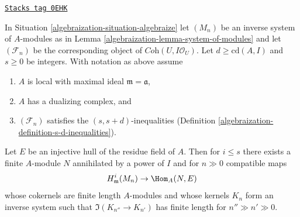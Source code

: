 \begin{lemma}
\label{algebraization-lemma-helper-algebraize}
\href{https://stacks.math.columbia.edu/tag/0EHK}{\texttt{Stacks tag 0EHK}}

In Situation \ref{algebraization-situation-algebraize} let $(M_n)$ be an inverse system of
$A$-modules as in Lemma \ref{algebraization-lemma-system-of-modules} and let
$(\mathcal{F}_n)$ be the corresponding object of
$\textit{Coh}(U, I\mathcal{O}_U)$. Let $d \geq \text{cd}(A, I)$
and $s \geq 0$ be integers.
With notation as above assume
\begin{enumerate}
\item $A$ is local with maximal ideal $\mathfrak m = \mathfrak a$,
\item $A$ has a dualizing complex, and
\item $(\mathcal{F}_n)$ satisfies the $(s, s + d)$-inequalities
(Definition \ref{algebraization-definition-s-d-inequalities}).
\end{enumerate}
Let $E$ be an injective hull of the residue field of $A$. Then for $i \leq s$
there exists a finite $A$-module $N$ annihilated by a power
of $I$ and for $n \gg 0$ compatible maps
$$
H^i_\mathfrak m(M_n) \to \Hom_A(N, E)
$$
whose cokernels are finite length $A$-modules and whose kernels $K_n$
form an inverse system such that $\Im(K_{n''} \to K_{n'})$ has finite
length for $n'' \gg n' \gg 0$.
\end{lemma}

